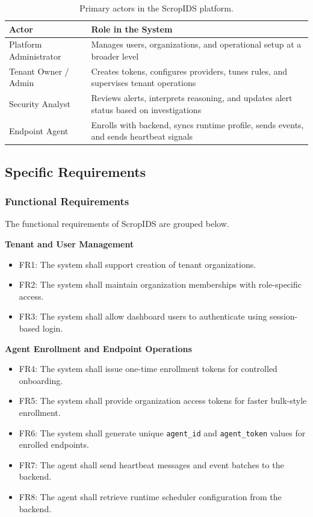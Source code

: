 \documentclass[12pt,a4paper]{article}
\begin{document}
\begin{table}[H]
\centering
\begin{tabularx}{\textwidth}{L{4cm}Y}
\toprule
\textbf{Actor} & \textbf{Role in the System} \\
\midrule
Platform Administrator & Manages users, organizations, and operational setup at a broader level \\
Tenant Owner / Admin & Creates tokens, configures providers, tunes rules, and supervises tenant operations \\
Security Analyst & Reviews alerts, interprets reasoning, and updates alert status based on investigations \\
Endpoint Agent & Enrolls with backend, syncs runtime profile, sends events, and sends heartbeat signals \\
\bottomrule
\end{tabularx}
\caption{Primary actors in the ScropIDS platform.}
\label{tab:actors}
\end{table}

\subsection{Specific Requirements}

\subsubsection{Functional Requirements}
The functional requirements of ScropIDS are grouped below.

\textbf{Tenant and User Management}
\begin{itemize}
    \item FR1: The system shall support creation of tenant organizations.
    \item FR2: The system shall maintain organization memberships with role-specific access.
    \item FR3: The system shall allow dashboard users to authenticate using session-based login.
\end{itemize}

\textbf{Agent Enrollment and Endpoint Operations}
\begin{itemize}
    \item FR4: The system shall issue one-time enrollment tokens for controlled onboarding.
    \item FR5: The system shall provide organization access tokens for faster bulk-style enrollment.
    \item FR6: The system shall generate unique \texttt{agent\_id} and \texttt{agent\_token} values for enrolled endpoints.
    \item FR7: The agent shall send heartbeat messages and event batches to the backend.
    \item FR8: The agent shall retrieve runtime scheduler configuration from the backend.
\end{itemize}
\end{document}
